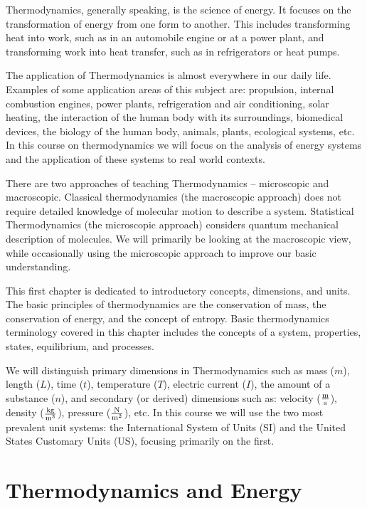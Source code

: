 Thermodynamics, generally speaking, is the science of energy. It focuses on the transformation of energy from one form to another.  This includes transforming heat into work, such as in an automobile engine or at a power plant, and transforming work into heat transfer, such as in refrigerators or heat pumps.

The application of Thermodynamics is almost everywhere in our daily life. Examples of some application areas of this subject are: propulsion, internal combustion engines, power plants, refrigeration and air conditioning, solar heating, the interaction of the human body with its surroundings, biomedical devices, the biology of the human body, animals, plants, ecological systems, etc. In this course on thermodynamics we will focus on the analysis of energy systems and the application of these systems to real world contexts.

There are two approaches of teaching Thermodynamics – microscopic and macroscopic. Classical thermodynamics (the macroscopic approach) does not require detailed knowledge of molecular motion to describe a system. Statistical Thermodynamics (the microscopic approach) considers quantum mechanical description of molecules. We will primarily be looking at the macroscopic view, while occasionally using the microscopic approach to improve our basic understanding.

This first chapter is dedicated to introductory concepts, dimensions, and units.
The basic principles of thermodynamics are the conservation of mass, the conservation of energy, and the concept of entropy.  Basic thermodynamics terminology covered in this chapter includes the concepts of a system, properties, states, equilibrium, and processes. 

We will distinguish primary dimensions in Thermodynamics such as mass ($m$), length ($L$), time ($t$), temperature ($T$), electric current ($I$), the amount of a substance ($n$), and secondary (or derived) dimensions such as: velocity ($\frac{\rm m}{\rm s}$), density ($\frac{\rm kg}{\rm m^3}$), pressure ($\frac{\rm N}{\rm m^2}$), etc. In this course we will use the two most prevalent unit systems: the International System of Units (SI) and the United States Customary Units (US), focusing primarily on the first.

\section{Thermodynamics and Energy}

